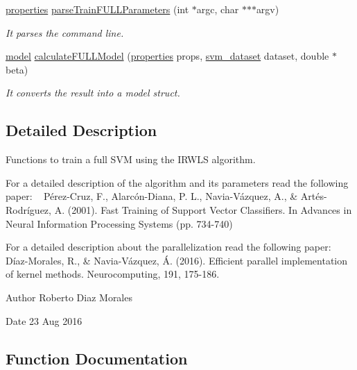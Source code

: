 \begin{DoxyCompactItemize}
\hyperlink{structproperties}{properties} \hyperlink{full-train_8h_a95d1fd5c95857701272b74eb9b0aed4e}{parse\+Train\+F\+U\+L\+L\+Parameters} (int $\ast$argc, char $\ast$$\ast$$\ast$argv)
\begin{DoxyCompactList}\small\item\em It parses the command line. \end{DoxyCompactList}\item 
\hyperlink{structmodel}{model} \hyperlink{full-train_8h_ace419c291424f97063310fc91332814e}{calculate\+F\+U\+L\+L\+Model} (\hyperlink{structproperties}{properties} props, \hyperlink{structsvm__dataset}{svm\+\_\+dataset} dataset, double $\ast$beta)
\begin{DoxyCompactList}\small\item\em It converts the result into a model struct. \end{DoxyCompactList}\end{DoxyCompactItemize}


\subsection{Detailed Description}
Functions to train a full S\+VM using the I\+R\+W\+LS algorithm. 

For a detailed description of the algorithm and its parameters read the following paper\+: ~\newline
 Pérez-\/\+Cruz, F., Alarcón-\/\+Diana, P. L., Navia-\/\+Vázquez, A., \& Artés-\/\+Rodríguez, A. (2001). Fast Training of Support Vector Classifiers. In Advances in Neural Information Processing Systems (pp. 734-\/740)

For a detailed description about the parallelization read the following paper\+: ~\newline
Díaz-\/\+Morales, R., \& Navia-\/\+Vázquez, Á. (2016). Efficient parallel implementation of kernel methods. Neurocomputing, 191, 175-\/186.

\begin{DoxyAuthor}{Author}
Roberto Diaz Morales 
\end{DoxyAuthor}
\begin{DoxyDate}{Date}
23 Aug 2016 
\end{DoxyDate}


\subsection{Function Documentation}
\hypertarget{full-train_8h_ace419c291424f97063310fc91332814e}{}\label{full-train_8h_ace419c291424f97063310fc91332814e} 
